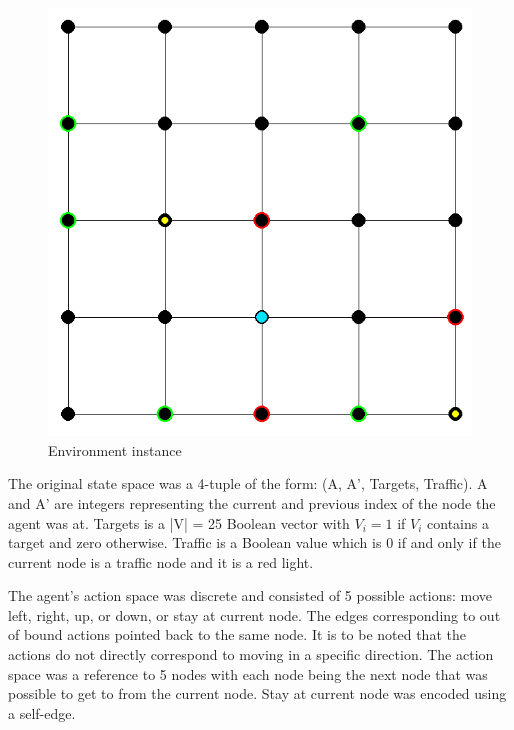 \documentclass{article}
\begin{document}
	\begin{figure}[hbt!]
		\label{grid_world}
		\centering
		\includegraphics[scale=0.4]{grid-world.png}
		\caption{Environment instance}
		\label{fig:grid-world.png}
	\end{figure}
	\FloatBarrier 
	
	The original state space was a 4-tuple of the form: (A, A', Targets, Traffic). A and A' are integers representing the current and previous index of the node the agent was at. Targets is a |V| = 25 Boolean vector with $V_{i}=1$ if $V_i$ contains a target and zero otherwise. Traffic is a Boolean value which is 0 if and only if the current node is a traffic node and it is a red light.
	
	The agent's action space was discrete and consisted of 5 possible actions: move left, right, up, or down, or stay at current node. The edges corresponding to out of bound actions pointed back to the same node. It is to be noted that the actions do not directly correspond to moving in a specific direction. The action space was a reference to 5 nodes with each node being the next node that was possible to get to from the current node. Stay at current node was encoded using a self-edge.
	
\end{document}
